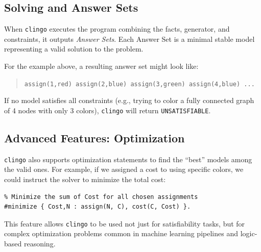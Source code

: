 \subsection{Solving and Answer Sets}
When \texttt{clingo} executes the program combining the facts, generator, and constraints, it outputs \textit{Answer Sets}. Each Answer Set is a minimal stable model representing a valid solution to the problem.

For the example above, a resulting answer set might look like:
\begin{quote}
\texttt{assign(1,red) assign(2,blue) assign(3,green) assign(4,blue) ...}
\end{quote}
If no model satisfies all constraints (e.g., trying to color a fully connected graph of 4 nodes with only 3 colors), \texttt{clingo} will return \texttt{UNSATISFIABLE}.

\subsection{Advanced Features: Optimization}
\texttt{clingo} also supports optimization statements to find the ``best'' models among the valid ones. For example, if we assigned a cost to using specific colors, we could instruct the solver to minimize the total cost:
\begin{lstlisting}
% Minimize the sum of Cost for all chosen assignments
#minimize { Cost,N : assign(N, C), cost(C, Cost) }.
\end{lstlisting}
This feature allows \texttt{clingo} to be used not just for satisfiability tasks, but for complex optimization problems common in machine learning pipelines and logic-based reasoning.





